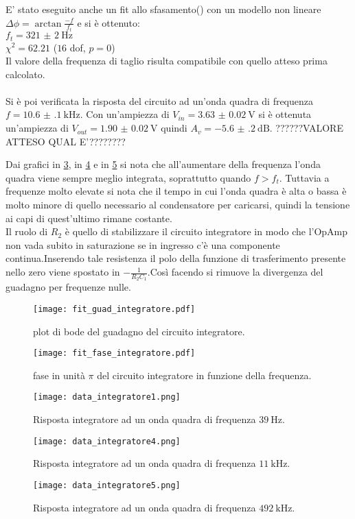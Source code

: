 E' stato eseguito anche un fit allo sfasamento() con un modello non lineare $\Delta \phi= \arctan{\frac{-f}{f_t}}$ e si è ottenuto:\\
$f_t= \SI{321(2)}{\Hz}$\\
$\chi^2=62.21$ ($16$ dof, $p = 0$)\\
Il valore della frequenza di taglio risulta compatibile con quello atteso prima calcolato.\\
\\
Si è poi verificata la risposta del circuito ad un'onda quadra di frequenza $f= \SI{10.6(1)}{\kHz}$. Con un'ampiezza di $V_{in}=\SI{3.63(2)}{\V}$ si è ottenuta un'ampiezza di $V_{out}=\SI{1.90(2)}{\V}$ quindi $A_v=\SI{-5.6(2)}{\dB}$.
??????VALORE ATTESO QUAL E'????????

Dai grafici in \ref{f:integ1}, in \ref{f:integ3} e in \ref{f:integ5} si nota che all'aumentare della frequenza l'onda quadra viene sempre meglio integrata, soprattutto quando $f> f_t$. Tuttavia a frequenze molto elevate si nota che il tempo in cui l'onda quadra è alta o bassa è molto minore di quello necessario al condensatore per caricarsi, quindi la tensione ai capi di quest'ultimo rimane costante. \\
Il ruolo di $R_2$ è quello di stabilizzare il circuito integratore in modo che l'OpAmp non vada subito in saturazione se in ingresso c'è una componente continua.Inserendo tale resistenza il polo della funzione di trasferimento presente nello zero viene spostato in $-\frac{1}{R_2C_1}$.Così facendo si rimuove la divergenza del guadagno per frequenze nulle.

\begin{figure}[h]
	\centering
	\texttt{[image: fit\_guad\_integratore.pdf]}
	\caption{plot di bode del guadagno del circuito integratore.}
	\label{f:guad_integ}
\end{figure}

\begin{figure}[h]
	\centering
	\texttt{[image: fit\_fase\_integratore.pdf]}
	\caption{fase in unità $\pi$ del circuito integratore in funzione della frequenza.}
	\label{f:fase_integ}
\end{figure}

\begin{figure}[h]
	\centering
	\texttt{[image: data\_integratore1.png]}
	\caption{Risposta integratore ad un onda quadra di frequenza $\SI{39}{\Hz}$.}
	\label{f:integ1}
\end{figure}

\begin{figure}[h]
	\centering
	\texttt{[image: data\_integratore4.png]}
	\caption{Risposta integratore ad un onda quadra di frequenza $\SI{11}{\kHz}$.}
	\label{f:integ3}
\end{figure}	

\begin{figure}[h]
	\centering
	\texttt{[image: data\_integratore5.png]}
	\caption{Risposta integratore ad un onda quadra di frequenza $\SI{492}{\kHz}$.}
	\label{f:integ5}
\end{figure}